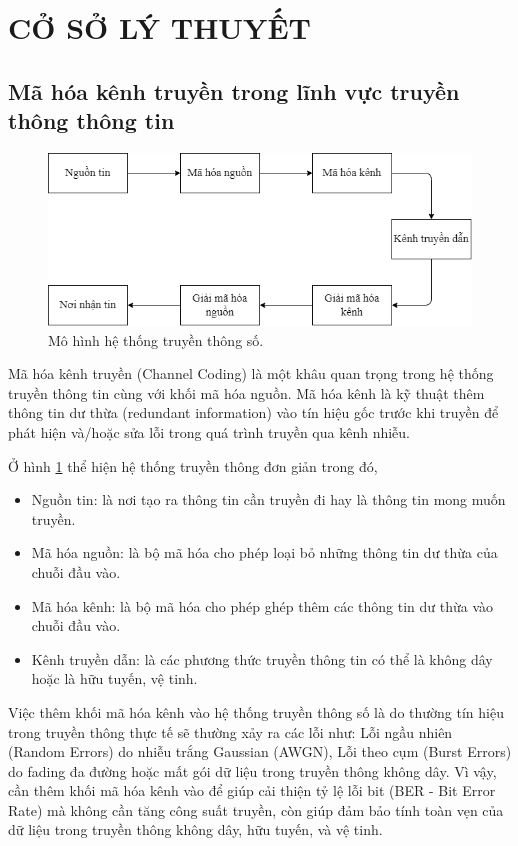 \section{CỞ SỞ LÝ THUYẾT}

\subsection{Mã hóa kênh truyền trong lĩnh vực truyền thông thông tin}

\begin{figure}[H]
	\centering
	\includegraphics[width=0.6\linewidth]{sections/pic/cosolythuyet/ma-hoa-kenh.png}
	\caption{Mô hình hệ thống truyền thông số.}
	\label{f_mo-hinh-he-thong-truyen-thong-so}
\end{figure}

Mã hóa kênh truyền (Channel Coding) là một khâu quan trọng trong hệ thống truyền thông tin cùng với khối mã hóa nguồn. Mã hóa kênh là kỹ thuật thêm thông tin dư thừa (redundant information) vào tín hiệu gốc trước khi truyền để phát hiện và/hoặc sửa lỗi trong quá trình truyền qua kênh nhiễu.

Ở hình \ref{f_mo-hinh-he-thong-truyen-thong-so} thể hiện hệ thống truyền thông đơn giản trong đó,
\begin{itemize}[label=-]
	\item Nguồn tin: là nơi tạo ra thông tin cần truyền đi hay là thông tin mong muốn truyền.
	\item Mã hóa nguồn: là bộ mã hóa cho phép loại bỏ những thông tin dư thừa của chuỗi đầu vào.
	\item Mã hóa kênh: là bộ mã hóa cho phép ghép thêm các thông tin dư thừa vào chuỗi đầu vào.
	\item Kênh truyền dẫn: là các phương thức truyền thông tin có thể là không dây hoặc là hữu tuyến, vệ tinh.
\end{itemize}

Việc thêm khối mã hóa kênh vào hệ thống truyền thông số là do thường tín hiệu trong truyền thông thực tế sẽ thường xảy ra các lỗi như: Lỗi ngầu nhiên (Random Errors) do nhiễu trắng Gaussian (AWGN), Lỗi theo cụm (Burst Errors) do fading đa đường hoặc mất gói dữ liệu trong truyền thông không dây. Vì vậy, cần thêm khối mã hóa kênh vào để giúp cải thiện tỷ lệ lỗi bit (BER - Bit Error Rate) mà không cần tăng công suất truyền, còn giúp đảm bảo tính toàn vẹn của dữ liệu trong truyền thông không dây, hữu tuyến, và vệ tinh.

